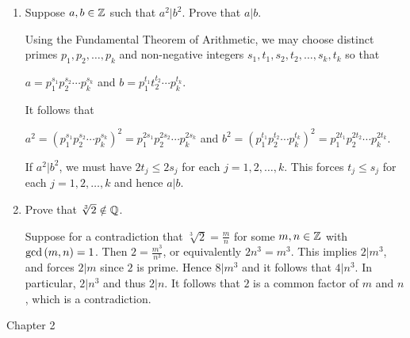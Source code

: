 \documentclass[11pt,fleqn,dvipsnames,usenames]{article}
\newcommand{\p}{\noindent}
\begin{document}
\begin{enumerate}
\item Suppose $a,b\in\mathbb{Z}$ such that $a^2|b^2$.  Prove that $a|b$.
\vsmsp

\solution Using the Fundamental Theorem of Arithmetic, we may choose distinct primes $p_{1},p_{2},\ldots, p_{k}$ and non-negative integers $s_{1},t_{1},s_{2},t_{2},\ldots,s_{k},t_{k}$ so that
\begin{center}
$a = p_{1}^{s_{1}}p_{2}^{s_{2}}\cdots p_{k}^{s_{k}}$ and $b = p_{1}^{t_{1}}t_{2}^{t_{2}}\cdots p_{k}^{t_{k}}$.
\end{center}
\p It follows that
\begin{center}
$a^2 = \left(p_{1}^{s_{1}}p_{2}^{s_{2}}\cdots p_{k}^{s_{k}}\right)^2 = p_{1}^{2s_{1}}p_{2}^{2s_{2}}\cdots p_{k}^{2s_{k}}$ and $b^2 = \left(p_{1}^{t_{1}}p_{2}^{t_{2}}\cdots p_{k}^{t_{k}}\right)^2 = p_{1}^{2t_{1}}p_{2}^{2t_{2}}\cdots p_{k}^{2t_{k}}$.
\end{center}
\p If $a^2|b^2$, we must have $2t_{j}\leq 2s_{j}$ for each $j=1,2,\ldots, k$.  This forces $t_{j}\leq s_{j}$ for each $j=1,2,\ldots, k$ and hence $a|b$.

\item Prove that $\sqrt[3]{2}\notin\mathbb{Q}$.
\vsmsp

\solution Suppose for a contradiction that $\sqrt[3]{2} = \frac{m}{n}$ for some $m,n\in\mathbb{Z}$ with $\text{gcd}\left(m,n\right)=1$.  Then $2 = \frac{m^3}{n^3}$, or equivalently $2n^3 = m^3$.  This implies $2|m^3$, and forces $2|m$ since $2$ is prime.  Hence $8|m^3$ and it follows that $4|n^3$.  In particular, $2|n^3$ and thus $2|n$.  It follows that $2$ is a common factor of $m$ and $n$, which is a contradiction.


\end{enumerate}
\vsp

{\huge Chapter 2}
\vsp
\end{document}
